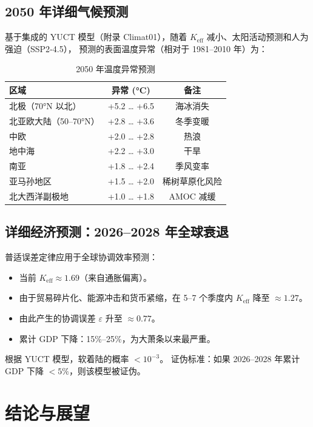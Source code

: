 \documentclass[12pt,a4paper]{article}
\newcommand{\Keff}{K_{\mathrm{eff}}}
\begin{document}
	\subsection{2050 年详细气候预测}
	
	基于集成的 YUCT 模型（附录 Climat01），随着 $\Keff$ 减小、太阳活动预测和人为强迫（SSP2‑4.5），
	预测的表面温度异常（相对于 1981–2010 年）为：
	
	\begin{table}[H]
		\centering
		\caption{2050 年温度异常预测}
		\begin{tabular}{lcc}
			\toprule
			区域 & 异常 (°C) & 备注 \\
			\midrule
			北极（70°N 以北） & +5.2 … +6.5 & 海冰消失 \\
			北亚欧大陆（50–70°N） & +2.8 … +3.6 & 冬季变暖 \\
			中欧 & +2.0 … +2.8 & 热浪 \\
			地中海 & +2.2 … +3.0 & 干旱 \\
			南亚 & +1.8 … +2.4 & 季风变率 \\
			亚马孙地区 & +1.5 … +2.0 & 稀树草原化风险 \\
			北大西洋副极地 & +1.0 … +1.8 & AMOC 减缓 \\
			\bottomrule
		\end{tabular}
	\end{table}
	
	\subsection{详细经济预测：2026–2028 年全球衰退}
	
	普适误差定律应用于全球协调效率预测：
	\begin{itemize}
		\item 当前 $\Keff \approx 1.69$（来自通胀偏离）。
		\item 由于贸易碎片化、能源冲击和货币紧缩，在 5–7 个季度内 $\Keff$ 降至 $\approx 1.27$。
		\item 由此产生的协调误差 $\varepsilon$ 升至 $\approx 0.77$。
		\item 累计 GDP 下降：15\%–25\%，为大萧条以来最严重。
	\end{itemize}
	根据 YUCT 模型，软着陆的概率 $<10^{-3}$。
	证伪标准：如果 2026–2028 年累计 GDP 下降 $<5\%$，则该模型被证伪。
	
	\section{结论与展望}
	
\end{document}
